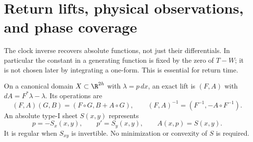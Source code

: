\section{Return lifts, physical observations, and phase coverage}
\label{sec:v83-geometry}
The clock inverse recovers absolute functions, not just their
differentials. In particular the constant in a generating function is
fixed by the zero of $T-W$; it is not chosen later by integrating a
one-form. This is essential for return time.

On a canonical domain $X\subset\R^{2h}$ with $\lambda=p\,dx$, an
exact lift is $(F,A)$ with $dA=F^*\lambda-\lambda$. Its operations are
\begin{equation}\label{eq:v83-lifts}
 (F,A)(G,B)=(F\circ G,B+A\circ G),\qquad
 (F,A)^{-1}=(F^{-1},-A\circ F^{-1}).
\end{equation}
An absolute type-I sheet $S(x,y)$ represents
\begin{equation}\label{eq:v83-generating}
 p=-S_x(x,y),\qquad p'=S_y(x,y),\qquad A(x,p)=S(x,y).
\end{equation}
It is regular when $S_{xy}$ is invertible. No minimization or convexity
of $S$ is required.

